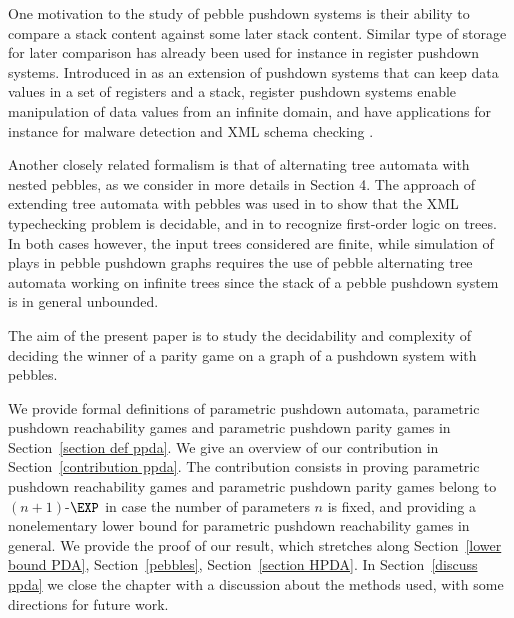 \documentclass[a4paper,UKenglish,cleveref, autoref, thm-restate]{lipics-v2021}
\begin{document}
One motivation to the study of pebble pushdown systems is their ability to compare a stack content against some later stack content.
Similar type of storage for later comparison has already been used for instance
in register pushdown systems. Introduced in \cite{murawski2017reachability}
 as an extension of pushdown systems that 
 can keep data values in
 a set of registers and a stack,
register pushdown systems
enable
manipulation of
data values from an infinite domain,
and have applications for instance for
malware detection and XML schema
checking \cite{senda2021forward, senda2021ltl}.





Another closely related formalism is that of alternating tree automata with nested pebbles, as we 
consider in more details in Section 4. The approach of extending tree automata with pebbles was used in \cite{milo2000typechecking} to show that the XML typechecking problem is decidable, and in \cite{karhumaki2012jewels} to recognize first-order logic on trees. In both cases however, the input trees considered are finite, while 
simulation of plays in pebble pushdown graphs
requires the use of pebble alternating tree automata working on infinite trees
since the stack of a pebble pushdown system is in general unbounded.






The aim of the present paper is to study the decidability and complexity of
deciding
the winner of a parity game on a graph of a pushdown system with  
pebbles.


 \iffalse
 
 
We provide formal definitions of parametric pushdown automata, parametric pushdown reachability games
and parametric pushdown parity games in Section~\ref{section def ppda}. We give an overview of our contribution in Section~\ref{contribution ppda}. The contribution consists in
proving parametric pushdown reachability games
and parametric pushdown parity games belong to $(n+1)$-$\EXP$ in case the number of parameters
$n$ is fixed,
and providing a nonelementary lower bound for parametric pushdown reachability games in general.
We provide the proof of our result, which stretches along 
Section~\ref{lower bound PDA},
Section~\ref{pebbles},
Section~\ref{section HPDA}.
In Section~\ref{discuss ppda} we close the chapter with a discussion about the methods used, with some directions for future work.
\end{document}
